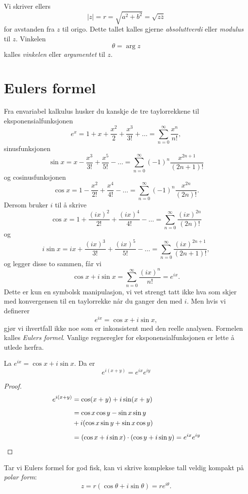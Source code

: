  Vi skriver ellers
 \[|z|=r=\sqrt{a^2+b^2}=\sqrt{z\overline z}\]
 for avstanden fra $z$ til origo. 
 Dette tallet kalles gjerne \emph{absoluttverdi} eller \emph{modulus} til $z$. 
 Vinkelen 
 \[
 \theta= \arg z
 \] 
 kalles \emph{vinkelen} eller \emph{argumentet} til $z$.


\section*{Eulers formel}
Fra envariabel kalkulus husker du kanskje de tre taylorrekkene til eksponensialfunksjonen
\[
e^{x}=1+x+\frac{x^{2}}{2}+\frac{x^{3}}{3!}+\dots=\sum_{n=0}^{\infty}\frac{x^{n}}{n!}, 
\]
sinusfunksjonen
\[
\sin{x}=x-\frac{x^{3}}{3!}+\frac{x^{5}}{5!}-\dots=\sum_{n=0}^{\infty}(-1)^{n}\frac{x^{2n+1}}{(2n+1)!} 
\]
og cosinusfunksjonen
\[
\cos{x}=1-\frac{x^{2}}{2!}+\frac{x^{4}}{4!}-\dots=\sum_{n=0}^{\infty}(-1)^{n}\frac{x^{2n}}{(2n)!}.
\]
Dersom bruker $i$ til å skrive
\[
\cos{x}=1+\frac{(ix)^{2}}{2!}+\frac{(ix)^{4}}{4!}-\dots=\sum_{n=0}^{\infty}\frac{(ix)^{2n}}{(2n)!}
\]
og 
\[
i\sin{x}=ix+\frac{(ix)^{3}}{3!}+\frac{(ix)^{5}}{5!}-\dots=\sum_{n=0}^{\infty}\frac{(ix)^{2n+1}}{(2n+1)!},
\]
og legger disse to sammen, får vi 
\[
\cos x + i\sin x=\sum_{n=0}^{\infty}\frac{(ix)^{n}}{n!}=e^{ix}.
\]
Dette er kun en symbolsk manipulasjon, 
vi vet strengt tatt ikke hva som skjer med konvergensen til en taylorrekke når du ganger den med $i$. 
Men hvis vi definerer 
\[
e^{ix}=\cos x + i\sin x,
\]
gjør vi ihvertfall ikke noe som er inkonsistent med den reelle analysen. 
Formelen kalles \emph{Eulers formel}. 
Vanlige regneregler for eksponensialfunksjonen er lette å utlede herfra. 
\begin{thm}
La
$
e^{ix}=\cos x + i\sin x.
$
Da er
\[
e^{i(x+y)}  = e^{ix}e^{iy}
\]
\end{thm}
\begin{proof}
\begin{align*}
e^{i(x+y)}  &= \cos (x+y) + i\sin (x+y) \\[5pt] &= \cos x \cos y - \sin x \sin y \\ &+ i (\cos x \sin y + \sin x \cos y) \\[5pt] &= 
(\cos x+ i \sin x) \cdot (\cos y+ i \sin y) = e^{ix}e^{iy} \qedhere
\end{align*}
\end{proof}
\noindent Tar vi Eulers formel for god fisk, kan vi skrive komplekse tall veldig kompakt på \emph{polar form}:
\[
z=r(\cos \theta+i\sin \theta)=re^{i\theta}.
\]

